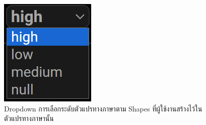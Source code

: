 \begin{figure}[ht]
    \centering
    \includegraphics[scale=0.75]{images/web-tuts/settings-rules-dd.PNG}
    \caption{Dropdown การเลือกระดับตัวแปรทางภาษาตาม Shapes ที่ผู้ใช้งานสร้างไว้ในตัวแปรทางภาษานั้น}
    \label{fig:settings-rules-dd}
\end{figure}
\FloatBarrier


